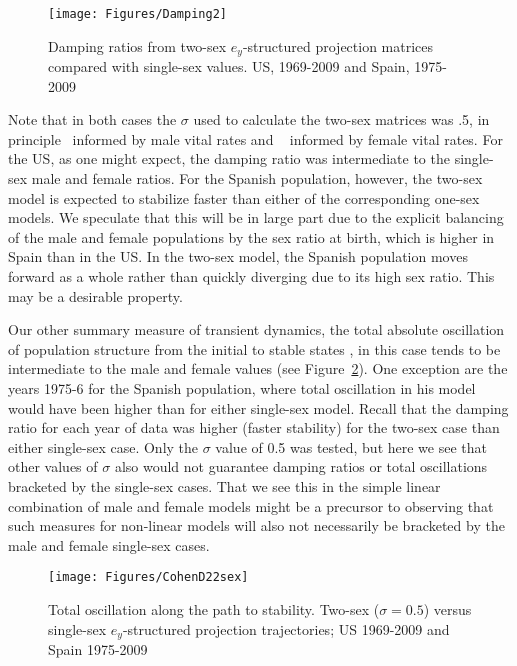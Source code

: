 \begin{figure}[ht!]
        \centering  
          \caption{Damping ratios from two-sex $e_y$-structured projection
          matrices compared with single-sex values. US, 1969-2009 and Spain,
          1975-2009}
           \texttt{[image: Figures/Damping2]}
          \label{fig:damping2}
\end{figure}
Note that in both cases the $\sigma$ used to calculate the two-sex matrices was
.5, in principle \textonehalf~informed by male vital rates and \textonehalf~
informed by female vital rates. For the US, as one might expect, the damping
ratio was intermediate to the single-sex male and female ratios. For
the Spanish population, however, the two-sex model is expected to stabilize
faster than either of the corresponding one-sex models. We speculate that this
will be in large part due to the explicit balancing of the male and female
populations by the sex ratio at birth, which is higher in Spain than in the US. 
In the two-sex model, the Spanish population moves forward as a whole rather 
than quickly diverging due to its high sex ratio. This may be a desirable
property.

Our other summary measure of transient dynamics, the total absolute
oscillation of population structure from the initial to stable states
\citep{cohen1979cumulative}, in this case tends to be intermediate to the male
and female values (see Figure~\ref{fig:cohend22sex}). One exception are the
years 1975-6 for the Spanish population, where total oscillation in his model
would have been higher than for either single-sex model. Recall that the damping
ratio for each year of data was higher (faster stability) for the two-sex case 
than either single-sex case. Only the $\sigma$ value of 0.5 was tested, but here
we see that other values of $\sigma$ also would not guarantee damping ratios or
total oscillations bracketed by the single-sex cases. That we see this in the
simple linear combination of male and female models might be a precursor to
observing that such measures for non-linear models will also not necessarily be
bracketed by the male and female single-sex cases.

\begin{figure}[ht!]
        \centering  
          \caption{Total oscillation along the path to
       stability. Two-sex ($\sigma = 0.5$) versus single-sex $e_y$-structured
       projection trajectories; US 1969-2009 and Spain 1975-2009}
           \texttt{[image: Figures/CohenD22sex]}
          \label{fig:cohend22sex}
\end{figure}
 \FloatBarrier





